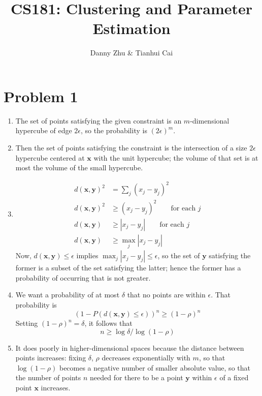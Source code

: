 \documentclass{article}
\title{CS181: Clustering and Parameter Estimation}
\author{Danny Zhu \& Tianhui Cai}
\let\b\mathbf
\begin{document}
\maketitle

\section*{Problem 1}
\begin{enumerate}
\item The set of points satisfying the given constraint is an
  $m$-dimensional hypercube of edge $2\epsilon$, so the probability is
  $(2\epsilon)^m$.
\item Then the set of points satisfying the constraint is the
  intersection of a size $2\epsilon$ hypercube centered at $\mathbf x$
  with the unit hypercube; the volume of that set is at most the
  volume of the small hypercube.
\item 
  \begin{align*}
    d(\b x,\b y)^2&=\sum_j(x_j-y_j)^2\\
    d(\b x,\b y)^2&\ge(x_j-y_j)^2\qquad\textrm{for each $j$}\\
    d(\b x,\b y)&\ge|x_j-y_j|\qquad\textrm{for each $j$}\\
    d(\b x,\b y)&\ge\max_j|x_j-y_j|
  \end{align*}
  Now, $d(\b x,\b y)\le\epsilon$ implies $\max_j|x_j-y_j|\le\epsilon$,
  so the set of $\b y$ satisfying the former is a subset of the set
  satisfying the latter; hence the former has a probability of
  occurring that is not greater.
\item We want a probability of at most $\delta$ that no points are
  within $\epsilon$. That probability is 
  $$(1-P(d(\mathbf x,\mathbf y)\leq \epsilon))^n\geq (1-\rho)^n$$
  Setting $(1-\rho)^n=\delta$, it follows that
  $$n\geq \log \delta / \log(1-\rho)$$
\item It does poorly in higher-dimensional spaces because the distance
  between points increases: fixing $\delta$, $\rho$ decreases 
  exponentially with $m$, so that $\log(1-\rho)$ becomes a negative number
  of smaller absolute value, so that the number of points $n$ needed
  for there to be a point $\mathbf y$ within $\epsilon$ of a fixed point  
  $\mathbf x$ increases. 
\end{enumerate}
\end{document}
